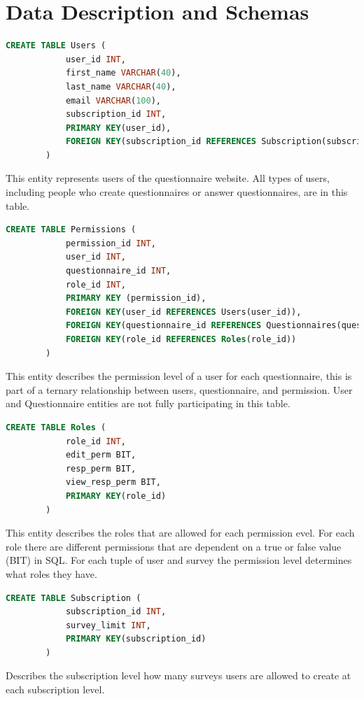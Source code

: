 \documentclass[12pt, oneside, a4paper]{article}
\begin{document}
    \newpage
    \section{Data Description and Schemas}
    \begin{lstlisting}[language=SQL, columns=flexible]
        CREATE TABLE Users (
            user_id INT,
            first_name VARCHAR(40),
            last_name VARCHAR(40),
            email VARCHAR(100),
            subscription_id INT, 
            PRIMARY KEY(user_id),
            FOREIGN KEY(subscription_id REFERENCES Subscription(subscription_id))
        ) 
    \end{lstlisting}
    This entity represents users of the questionnaire website.
    All types of users, including people who create questionnaires
    or answer questionnaires, are in this table.
    \\

    \begin{lstlisting}[language=SQL, columns=flexible]
        CREATE TABLE Permissions (
            permission_id INT,
            user_id INT,
            questionnaire_id INT,
            role_id INT,
            PRIMARY KEY (permission_id),
            FOREIGN KEY(user_id REFERENCES Users(user_id)),
            FOREIGN KEY(questionnaire_id REFERENCES Questionnaires(questionnaire_id)),
            FOREIGN KEY(role_id REFERENCES Roles(role_id))
        ) 
    \end{lstlisting}
    This entity describes the permission level of a user for each 
    questionnaire, this is part of a ternary relationship between users, questionnaire, and permission. User and Questionnaire entities are not fully participating in this table. 
    \\
    
    \begin{lstlisting}[language=SQL, columns=flexible]
        CREATE TABLE Roles (
            role_id INT,
            edit_perm BIT, 
            resp_perm BIT,
            view_resp_perm BIT,
            PRIMARY KEY(role_id)
        ) 
    \end{lstlisting}
    This entity describes the roles that are allowed for each permission evel. For each role there are different permissions that are dependent on a true or false value (BIT) in SQL. For each tuple of user and survey the permission level determines what roles they have.
    \\

    \begin{lstlisting}[language=SQL, columns=flexible]
        CREATE TABLE Subscription (
            subscription_id INT,
            survey_limit INT, 
            PRIMARY KEY(subscription_id)
        ) 
    \end{lstlisting}
    Describes the subscription level how many surveys users are allowed to create at each subscription level. 
    \\
\end{document}
